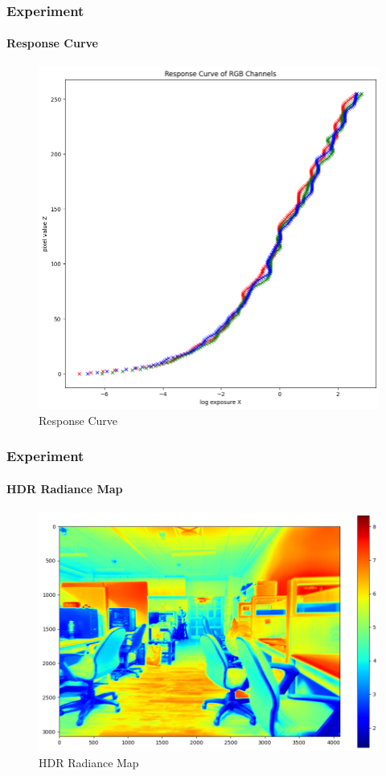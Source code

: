 \documentclass[
	11pt, %
	aspectratio=169, %
]{beamer}
\begin{document}
\begin{frame}
	\frametitle{Experiment}
	\framesubtitle{Response Curve}

	\begin{figure}
		\includegraphics[width=0.4\linewidth]{./Images/response_curve.png}
		\caption{Response Curve}
	\end{figure}
\end{frame}

\begin{frame}
	\frametitle{Experiment}
	\framesubtitle{HDR Radiance Map}

	\begin{figure}
		\includegraphics[width=0.55\linewidth]{./Images/hdr_radiance_map.png}
		\caption{HDR Radiance Map}
	\end{figure}
\end{frame}
\end{document}
